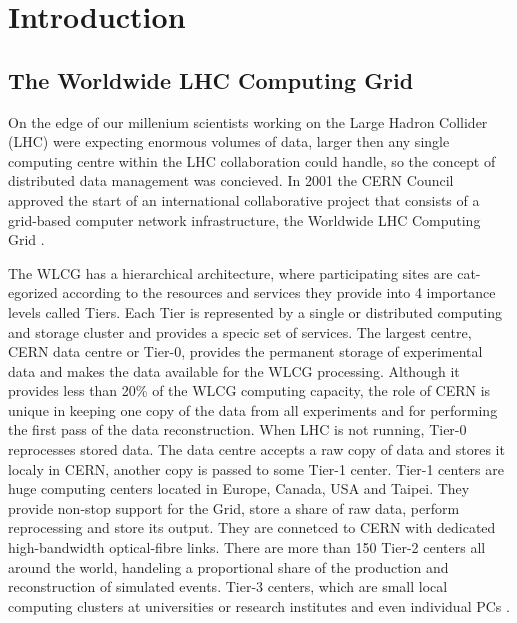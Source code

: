 \chapter*{Introduction}

\section*{The Worldwide LHC Computing Grid}
On the edge of our millenium scientists working on the Large Hadron Collider (LHC) were expecting enormous volumes of data, larger then any single computing centre within the LHC collaboration could handle, so the concept of distributed data management was concieved. In 2001 the CERN Council approved the start of an international collaborative project that consists of a grid-based computer network infrastructure, the Worldwide LHC Computing Grid \cite{happyBday}. 

The WLCG has a hierarchical architecture, where participating sites are cat- egorized according to the resources and services they provide into 4 importance levels called Tiers. Each Tier is represented by a single or distributed computing and storage cluster and provides a specic set of services. The largest centre, CERN data centre or Tier-0, provides the  permanent storage of experimental data and makes the data available for the WLCG processing. Although it provides less than 20\% of the WLCG computing capacity, the role of CERN is unique in keeping one copy of the data from all experiments and for performing the first pass of the data reconstruction. When LHC is not running, Tier-0 reprocesses stored data. The data centre accepts a raw copy of data and stores it localy in CERN, another copy is passed to some Tier-1 center. Tier-1 centers are huge computing centers located in Europe, Canada, USA and Taipei. They provide non-stop support for the Grid, store a share of raw data, perform reprocessing and store its output. They are connetced to CERN with dedicated high-bandwidth optical-fibre links. There are more than 150 Tier-2 centers all around the world, handeling a proportional share of the production and reconstruction of simulated events. Tier-3 centers, which are small local computing clusters at universities or research institutes and even individual PCs \cite{TGrid}.

